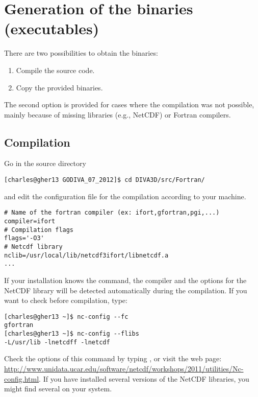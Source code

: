 \section{Generation of the binaries (executables)}

There are two possibilities to obtain the binaries: 
\begin{enumerate}
\item Compile the source code.
\item Copy the provided binaries.
\end{enumerate}
The second option is provided for cases where the compilation was not possible, mainly because of missing libraries (e.g., NetCDF) or Fortran compilers.

\subsection{Compilation\label{sec:compilation}}
Go in the source directory 
\begin{lstlisting}[style=Bash]
[charles@gher13 GODIVA_07_2012]$ cd DIVA3D/src/Fortran/
\end{lstlisting}
and edit the configuration file  for the compilation  according to your machine. 

\begin{verbatim}
# Name of the fortran compiler (ex: ifort,gfortran,pgi,...)
compiler=ifort
# Compilation flags
flags='-O3'
# Netcdf library
nclib=/usr/local/lib/netcdf3ifort/libnetcdf.a
...
\end{verbatim}

If your installation knows the  command, the compiler and the options for the NetCDF  library will be detected automatically during the compilation. If you want to check before compilation, type:
\begin{lstlisting}[style=Bash]
[charles@gher13 ~]$ nc-config --fc
gfortran
[charles@gher13 ~]$ nc-config --flibs
-L/usr/lib -lnetcdff -lnetcdf
\end{lstlisting}
Check the options of this command by typing , or visit the web page: \url{http://www.unidata.ucar.edu/software/netcdf/workshops/2011/utilities/Nc-config.html}. If you have installed several versions of the NetCDF libraries, you might find several  on your system.



